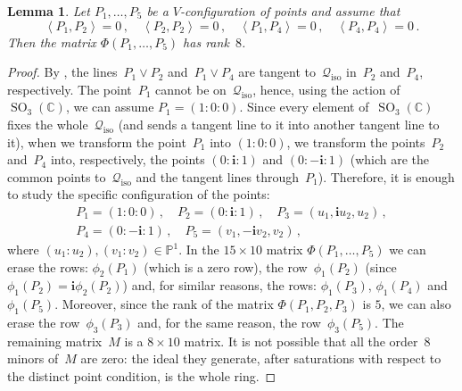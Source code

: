 \documentclass{amsart}
\theoremstyle{plain}
\newtheorem{lemma}{Lemma}[section]
\theoremstyle{definition}
\newcommand{\C}{\mathbb{C}}
\newcommand{\p}{\mathbb{P}}
\newcommand{\iso}{\mathcal{Q}_{\mathrm{iso}}}
\newcommand{\SO}{\operatorname{SO}}
\newcommand{\scl}[2]{\left\langle {#1}, {#2} \right\rangle}
\newcommand{\iii}{\textbf{i}}
\begin{document}
\begin{lemma}
\label{lemma:special_case_rank_8}
Let $P_1, \dots, P_5$ be a $V$-configuration of points and assume that
%
\[
  \scl{P_1}{P_2}=0 \,, \quad
  \scl{P_2}{P_2}=0 \,, \quad
  \scl{P_1}{P_4}=0 \,, \quad
  \scl{P_4}{P_4}=0 \,.
\]
%
Then the matrix $\Phi(P_1, \dots, P_5)$ has rank~$8$.
\end{lemma}
\begin{proof}
By ,
the lines~$P_1 \vee P_2$ and~$P_1 \vee P_4$ are tangent to~$\iso$ in~$P_2$ and~$P_4$, respectively. 
The point~$P_1$ cannot be on~$\iso$, hence, using the
action of~$\SO_3(\C)$, we can assume $P_1 = (1: 0: 0)$.
Since every element of~$\SO_3(\C)$ fixes the whole~$\iso$ (and sends a tangent line to it into another tangent line to it), 
when we transform the point~$P_1$ into $(1: 0: 0)$, 
we transform the points~$P_2$ and~$P_4$ into, respectively,
the points $(0: \iii: 1)$ and $(0: -\iii: 1)$ (which are the common points to~$\iso$ and the tangent lines through~$P_1$).
Therefore, it is enough to study the
specific configuration of the points:
%
\begin{gather*}
  P_1 = (1: 0: 0) \,, \quad P_2=(0: \iii: 1) \,, \quad P_3=(u_1, \iii u_2, u_2) \,, \\
  P_4 = (0: -\iii: 1) \,, \quad P_5 = (v_1, -\iii v_2, v_2) \,,
\end{gather*}
%
where $(u_1: u_2), (v_1: v_2) \in \p^1$.
In the $15\times 10$ matrix $\Phi(P_1, \dots, P_5)$ we can erase the
rows: $\phi_2(P_1)$ (which is a zero row), the row~$\phi_1(P_2)$
(since $\phi_1(P_2)=\iii\phi_2(P_2)$) and, for similar reasons, the
rows: $\phi_1(P_3)$, $\phi_1(P_4)$ and~$\phi_1(P_5)$.
Moreover, since the rank of the matrix $\Phi(P_1, P_2, P_3)$ is $5$,
we can also erase the row~$\phi_3(P_3)$ and, for the same reason, the
row~$\phi_3(P_5)$. The remaining matrix~$M$ is a $8 \times 10$ matrix.
It is not possible that all the order~$8$ minors
of~$M$ are zero: the ideal they generate, after saturations with respect to the distinct point condition, is the whole ring.
\end{proof}
\end{document}

